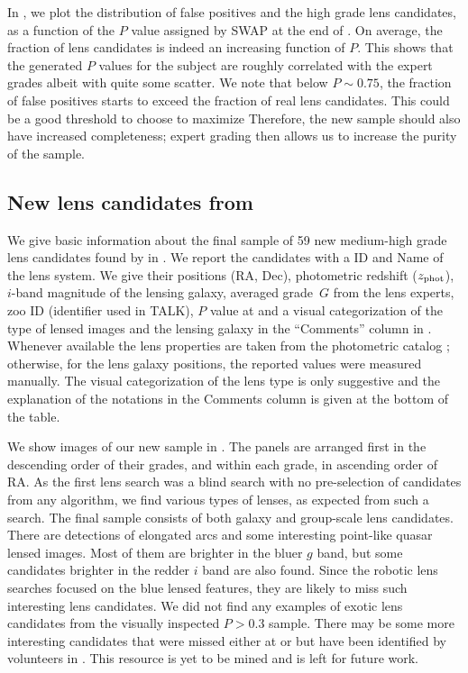 \documentclass[useAMS,usenatbib,a4paper]{mn2e}
\begin{document}
In , we plot the distribution of false positives and
the high grade lens candidates, as a function of the $P$ value assigned
by SWAP at the end of \StageTwo.  On average, the fraction of lens
candidates is indeed an increasing function of $P$. This shows that the
\sw generated $P$ values for the subject are roughly correlated with the
expert grades albeit with quite some scatter.  We note that below
$P\sim0.75$, the fraction of false positives starts to exceed the
fraction of real lens candidates. This could be a good threshold to
choose to maximize  Therefore, the new sample should
also have increased completeness; expert grading then allows us to
increase the purity of the sample.


\subsection{New lens candidates from \sw}
\label{sec:results:newcand}

We give basic information about the final sample of 59 new medium-high grade
lens candidates found by \sw in
. We report the candidates with a \sw ID and Name
of the lens system. We give their positions (RA, Dec), photometric
redshift ($z_{\rm phot}$), $i$-band magnitude of the lensing galaxy,
averaged grade~$G$ from the lens experts, zoo ID (identifier used in
TALK), $P$ value at \StageTwo and a visual categorization of the type of
lensed images and the lensing galaxy in the ``Comments'' column in
. Whenever available the lens properties are
taken from the \cfhtls photometric catalog \citep{Coupon2009}; otherwise,
for the lens galaxy positions, the reported values were measured
manually. The visual categorization of the lens type is only suggestive
and the explanation of the notations in the Comments column is given at
the bottom of the table.

We show images of our new sample in . The panels are arranged
first in the descending order of their grades, and within each grade, in
ascending order
of RA. As the first lens search was a blind search with no
pre-selection of candidates from any algorithm, we find various types of
lenses, as expected from such a search. The final sample consists of
both galaxy and group-scale lens candidates. There are detections of
elongated arcs and some interesting point-like quasar lensed images.
Most of them are brighter in the bluer $g$ band, but some candidates brighter
in the redder $i$ band are also found. Since the robotic lens searches
focused on the blue lensed features, they are likely to miss
such interesting lens candidates. We did not find any examples of
exotic lens candidates from the visually inspected $P>0.3$ sample.
There may be some more interesting candidates that were missed either at
\StageOne or \StageTwo but have been identified by volunteers in \Talk.
This resource is yet to be mined and is left for future work.
\end{document}
